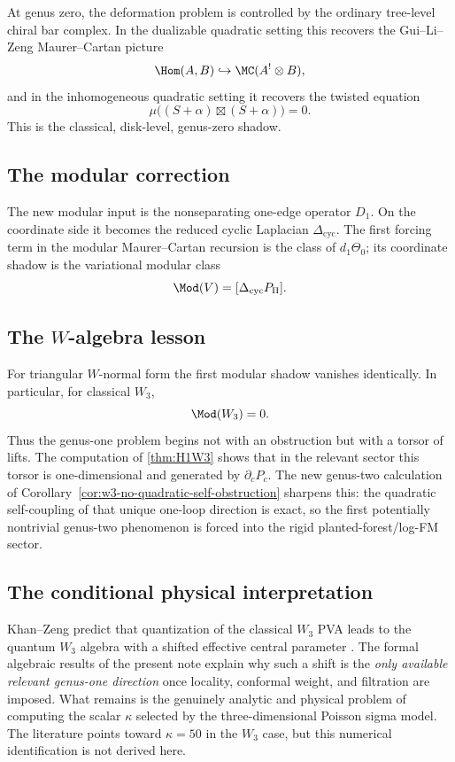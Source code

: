 At genus zero, the deformation problem is controlled by the ordinary tree-level chiral bar
complex. In the dualizable quadratic setting this recovers the Gui--Li--Zeng Maurer--Cartan
picture
\[
\Hom(A,B)\hookrightarrow \MC(A^!\otimes B),
\]
and in the inhomogeneous quadratic setting it recovers the twisted equation
\[
\mu\big((S+\alpha)\boxtimes(S+\alpha)\big)=0.
\]
This is the classical, disk-level, genus-zero shadow.

\subsection{The modular correction}

The new modular input is the nonseparating one-edge operator $D_1$. On the coordinate side
it becomes the reduced cyclic Laplacian $\Delta_{\mathrm{cyc}}$. The first forcing term in the
modular Maurer--Cartan recursion is the class of $d_1\Theta_0$; its coordinate shadow is the
variational modular class
\[
\Mod(V)=[\Delta_{\mathrm{cyc}}P_\Pi].
\]

\subsection{The $W$-algebra lesson}

For triangular $W$-normal form the first modular shadow vanishes identically. In particular,
for classical $W_3$,
\[
\Mod(W_3)=0.
\]
Thus the genus-one problem begins not with an obstruction but with a torsor of lifts. The
computation of \cref{thm:H1W3} shows that in the relevant sector this torsor is one-dimensional
and generated by $\partial_cP_c$.  The new genus-two calculation of
Corollary~\ref{cor:w3-no-quadratic-self-obstruction} sharpens this: the
quadratic self-coupling of that unique one-loop direction is exact, so the
first potentially nontrivial genus-two phenomenon is forced into the rigid
planted-forest/log-FM sector.

\subsection{The conditional physical interpretation}

Khan--Zeng predict that quantization of the classical $W_3$ PVA leads to the quantum $W_3$
algebra with a shifted effective central parameter \cite{KZ25}. The formal algebraic
results of the present note explain why such a shift is the \emph{only available relevant
genus-one direction} once locality, conformal weight, and filtration are imposed. What
remains is the genuinely analytic and physical problem of computing the scalar $\kappa$
selected by the three-dimensional Poisson sigma model. The literature points toward
$\kappa=50$ in the $W_3$ case, but this numerical identification is not derived here.

